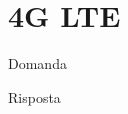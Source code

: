 \section{4G LTE}

\begin{questions}
    \question Domanda
    
    \begin{solution}
        Risposta
    \end{solution}
\end{questions}